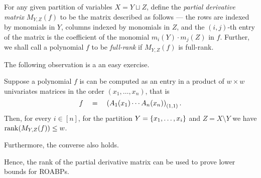 \begin{definition} \label{defn:pdm-commutative}
For any given partition of variables $X = Y \sqcup Z$, define the \emph{partial derivative matrix} $M_{Y,Z}(f)$ to be the matrix described as follows --- the rows are indexed by monomials in $Y$, columns indexed by monomials in $Z$, and the $(i,j)$-th entry of the matrix is the coefficient of the monomial $m_i(Y)\cdot m_j(Z)$ in $f$. 
Further, we shall call a polynomial $f$ to be \emph{full-rank} if $M_{Y,Z}(f)$ is full-rank.
\end{definition}


\medskip

\noindent
The following observation is a an easy exercise. 

\begin{lemma}
Suppose a polynomial $f$ is can be computed as an entry in a product of $w\times w$ univariates matrices in the order $(x_1,\ldots, x_n)$, that is
\[
f \quad = \quad \left(A_1(x_1) \cdots A_n(x_n) \right)_{(1,1)}.
\]
Then, for every $i \in [n]$, for the partition $Y = \left\{x_1, \ldots , x_{i}\right\}$ and $Z = X \setminus Y$ we have $\operatorname{rank}(M_{Y,Z}(f)) \leq w$. 

Furthermore, the converse also holds. 
\end{lemma}

Hence, the rank of the partial derivative matrix can be used to prove lower bounds for ROABPs. \\

